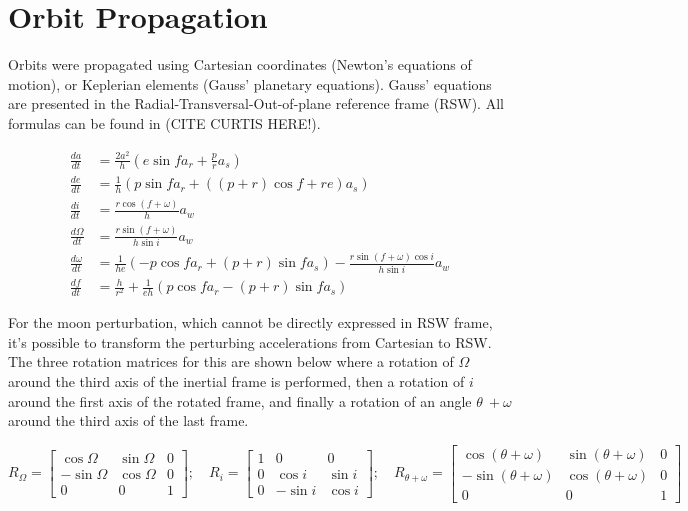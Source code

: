 \section{Orbit Propagation}
\label{sec:orbit_propagation}

Orbits were propagated using Cartesian coordinates (Newton’s equations of motion), or Keplerian elements (Gauss’ planetary equations). Gauss' equations are presented in the Radial-Transversal-Out-of-plane reference frame (RSW). All formulas can be found in (CITE CURTIS HERE!).

\begin{equation}
	\begin{aligned}
		\frac{da}{dt} &= \frac{2a^2}{h} \left( e\sin f a_r + \frac{p}{r} a_s \right) \\
		\frac{de}{dt} &= \frac{1}{h} \left( p\sin f a_r + \left( (p + r) \cos f + re \right) a_s \right) \\
		\frac{di}{dt} &= \frac{r\cos (f + \omega)}{h} a_w \\
		\frac{d\Omega}{dt} &= \frac{r\sin (f + \omega)}{h\sin i} a_w \\
		\frac{d\omega}{dt} &= \frac{1}{he} \left( -p\cos f a_r + (p + r)\sin f a_s \right) - \frac{r\sin(f + \omega) \cos i}{h\sin i} a_w \\
		\frac{df}{dt} &= \frac{h}{r^2} + \frac{1}{eh} \left( p\cos f a_r - (p + r)\sin f a_s \right)
	\end{aligned}
\end{equation}
\vspace*{3pt}

For the moon perturbation, which cannot be directly expressed in RSW frame, it's possible to transform the perturbing accelerations from Cartesian to RSW. The three rotation matrices for this are shown below where a rotation of \(\Omega\) around the third axis of the inertial frame is performed, then a rotation of \(i\) around the first axis of the rotated frame, and finally a rotation of an angle \(\theta\ + \omega\) around the third axis of the last frame.

\begin{equation}
	R_{\Omega} = \begin{bmatrix}
		\cos \Omega & \sin \Omega & 0 \\
		-\sin \Omega & \cos \Omega & 0 \\
		0 & 0 & 1
	\end{bmatrix}; \quad
	R_{i} = \begin{bmatrix}
		1 & 0 & 0 \\
		0 & \cos i & \sin i \\
		0 & -\sin i & \cos i
	\end{bmatrix}; \quad
	R_{\theta + \omega} = \begin{bmatrix}
		\cos (\theta + \omega) & \sin (\theta + \omega) & 0 \\
		-\sin (\theta + \omega) & \cos (\theta + \omega) & 0 \\
		0 & 0 & 1
	\end{bmatrix}
\end{equation}


